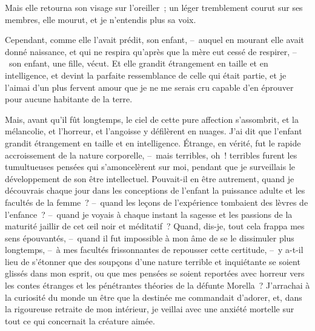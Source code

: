 \documentclass[french,twoside]{book} %
\begin{document}
Mais elle retourna son visage sur l’oreiller ; un léger tremblement courut sur ses membres, elle mourut, et je n’entendis plus sa voix.\par
Cependant, comme elle l’avait prédit, son enfant, – auquel en mourant elle avait donné naissance, et qui ne respira qu’après que la mère eut cessé de respirer, – son enfant, une fille, vécut. Et elle grandit étrangement en taille et en intelligence, et devint la parfaite ressemblance de celle qui était partie, et je l’aimai d’un plus fervent amour que je ne me serais cru capable d’en éprouver pour aucune habitante de la terre.\par
Mais, avant qu’il fût longtemps, le ciel de cette pure affection s’assombrit, et la mélancolie, et l’horreur, et l’angoisse y défilèrent en nuages. J’ai dit que l’enfant grandit étrangement en taille et en intelligence. Étrange, en vérité, fut le rapide accroissement de la nature corporelle, – mais terribles, oh ! terribles furent les tumultueuses pensées qui s’amoncelèrent sur moi, pendant que je surveillais le développement de son être intellectuel. Pouvait-il en être autrement, quand je découvrais chaque jour dans les conceptions de l’enfant la puissance adulte et les facultés de la femme ? – quand les leçons de l’expérience tombaient des lèvres de l’enfance ? – quand je voyais à chaque instant la sagesse et les passions de la maturité jaillir de cet œil noir et méditatif ? Quand, dis-je, tout cela frappa mes sens épouvantés, – quand il fut impossible à mon âme de se le dissimuler plus longtemps, – à mes facultés frissonnantes de repousser cette certitude, – y a-t-il lieu de s’étonner que des soupçons d’une nature terrible et inquiétante se soient glissés dans mon esprit, ou que mes pensées se soient reportées avec horreur vers les contes étranges et les pénétrantes théories de la défunte Morella ? J’arrachai à la curiosité du monde un être que la destinée me commandait d’adorer, et, dans la rigoureuse retraite de mon intérieur, je veillai avec une anxiété mortelle sur tout ce qui concernait la créature aimée.\par
\end{document}
